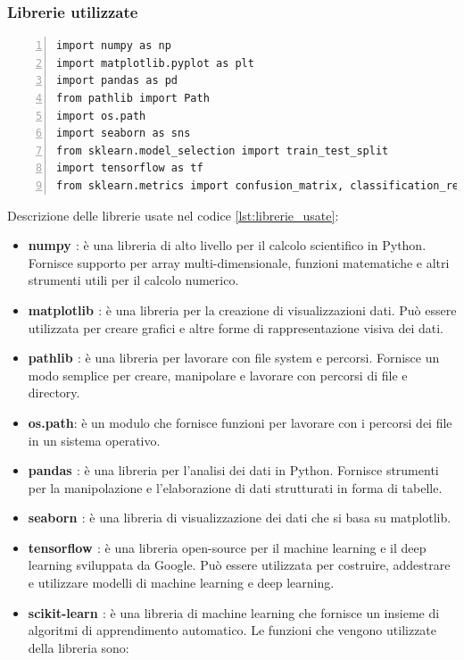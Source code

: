 \documentclass[a4paper,final,12pt]{report}
\begin{document}
\subsubsection{Librerie utilizzate}
\begin{lstlisting}[caption={Le librerie utilizzate}, label={lst:librerie_usate}, breaklines, escapechar=`\%, frame=lines, basicstyle=\small\ttfamily, keepspaces=true, numbers=left]
import numpy as np
import matplotlib.pyplot as plt
import pandas as pd
from pathlib import Path
import os.path
import seaborn as sns
from sklearn.model_selection import train_test_split
import tensorflow as tf
from sklearn.metrics import confusion_matrix, classification_report
\end{lstlisting}
Descrizione delle librerie usate nel codice \ref{lst:librerie_usate}:
\begin{itemize}
    \item \textbf{numpy \cite{numpy}}: è una libreria di alto livello per il calcolo scientifico in Python. Fornisce supporto per array multi-dimensionale, funzioni matematiche e altri strumenti utili per il calcolo numerico.
    \item \textbf{matplotlib \cite{matplotlib}}: è una libreria per la creazione di visualizzazioni dati. Può essere utilizzata per creare grafici e altre forme di rappresentazione visiva dei dati.
    \item \textbf{pathlib \cite{pathlib}}: è una libreria per lavorare con file system e percorsi. Fornisce un modo semplice per creare, manipolare e lavorare con percorsi di file e directory.
    \item \textbf{os.path}: è un modulo che fornisce funzioni per lavorare con i percorsi dei file in un sistema operativo.
    \item \textbf{pandas \cite{pandas}}: è una libreria per l'analisi dei dati in Python. Fornisce strumenti per la manipolazione e l'elaborazione di dati strutturati in forma di tabelle.
    \item \textbf{seaborn \cite{seaborn}}: è una libreria di visualizzazione dei dati che si basa su matplotlib.
    \item \textbf{tensorflow \cite{tensorflow}}: è una libreria open-source per il machine learning e il deep learning sviluppata da Google. Può essere utilizzata per costruire, addestrare e utilizzare modelli di machine learning e deep learning.
    \item \textbf{scikit-learn \cite{scikit}}: è una libreria di machine learning che fornisce un insieme di algoritmi di apprendimento automatico. Le funzioni che vengono utilizzate della libreria sono:

\end{itemize}
\end{document}
